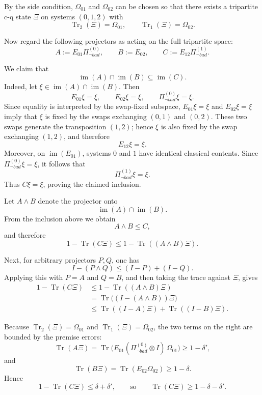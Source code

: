 \documentclass{report}
\theoremstyle{defn_style}
\begin{document}
By the side condition, $\Omega_{01}$ and $\Omega_{02}$ can be chosen so that
there exists a tripartite c-q state $\Xi$ on systems $(0,1,2)$ with
\[
\operatorname{Tr}_2(\Xi)=\Omega_{01},
\qquad
\operatorname{Tr}_1(\Xi)=\Omega_{02}.
\]

Now regard the following projectors as acting on the full tripartite space:
\[
A:=E_{01}\Pi_{\neg bad}^{(0)},
\qquad
B:=E_{02},
\qquad
C:=E_{12}\Pi_{\neg bad}^{(1)}.
\]

We claim that
\[
\operatorname{im}(A)\cap\operatorname{im}(B)\subseteq \operatorname{im}(C).
\]
Indeed, let $\xi\in \operatorname{im}(A)\cap\operatorname{im}(B)$.
Then
\[
E_{01}\xi=\xi,
\qquad
E_{02}\xi=\xi,
\qquad
\Pi_{\neg bad}^{(0)}\xi=\xi.
\]
Since equality is interpreted by the swap-fixed subspace, $E_{01}\xi=\xi$ and
$E_{02}\xi=\xi$ imply that $\xi$ is fixed by the swaps exchanging $(0,1)$ and
$(0,2)$. These two swaps generate the transposition $(1,2)$; hence $\xi$ is
also fixed by the swap exchanging $(1,2)$, and therefore
\[
E_{12}\xi=\xi.
\]
Moreover, on $\operatorname{im}(E_{01})$, systems $0$ and $1$ have identical
classical contents. Since $\Pi_{\neg bad}^{(0)}\xi=\xi$, it follows that
\[
\Pi_{\neg bad}^{(1)}\xi=\xi.
\]
Thus $C\xi=\xi$, proving the claimed inclusion.

Let $A\wedge B$ denote the projector onto
\[
\operatorname{im}(A)\cap\operatorname{im}(B).
\]
From the inclusion above we obtain
\[
A\wedge B \le C,
\]
and therefore
\[
1-\operatorname{Tr}(C\Xi)\le 1-\operatorname{Tr}((A\wedge B)\Xi).
\]

Next, for arbitrary projectors $P,Q$, one has
\[
I-(P\wedge Q)\le (I-P)+(I-Q).
\]
Applying this with $P=A$ and $Q=B$, and then taking the trace against $\Xi$,
gives
\begin{align*}
1-\operatorname{Tr}(C\Xi)
&\le 1-\operatorname{Tr}((A\wedge B)\Xi) \\
&= \operatorname{Tr}\bigl((I-(A\wedge B))\Xi\bigr) \\
&\le \operatorname{Tr}((I-A)\Xi)+\operatorname{Tr}((I-B)\Xi).
\end{align*}

Because $\operatorname{Tr}_2(\Xi)=\Omega_{01}$ and $\operatorname{Tr}_1(\Xi)=\Omega_{02}$,
the two terms on the right are bounded by the premise errors:
\[
\operatorname{Tr}(A\Xi)
=
\operatorname{Tr}\bigl(E_{01}(\Pi_{\neg bad}^{(0)}\otimes I)\,\Omega_{01}\bigr)
\ge 1-\delta',
\]
and
\[
\operatorname{Tr}(B\Xi)
=
\operatorname{Tr}(E_{02}\Omega_{02})
\ge 1-\delta.
\]
Hence
\[
1-\operatorname{Tr}(C\Xi)\le \delta+\delta',
\qquad\text{so}\qquad
\operatorname{Tr}(C\Xi)\ge 1-\delta-\delta'.
\]
\end{document}
